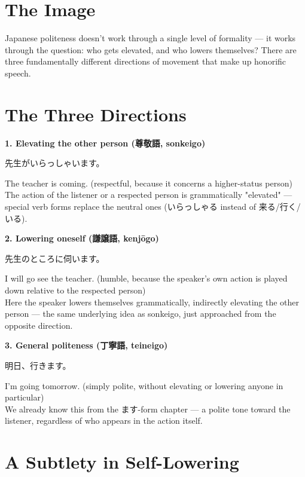 \documentclass[12pt]{book}
\begin{document}
\section*{The Image}

Japanese politeness doesn't work through a single level of formality — it works through the question: who gets elevated, and who lowers themselves? There are three fundamentally different directions of movement that make up honorific speech.

\section*{The Three Directions}

\textbf{1. Elevating the other person (尊敬語, sonkeigo)}
\par\quad 先生がいらっしゃいます。\\
\par\quad The teacher is coming. (respectful, because it concerns a higher-status person)\\

The action of the listener or a respected person is grammatically "elevated" — special verb forms replace the neutral ones (いらっしゃる instead of 来る/行く/いる).

\textbf{2. Lowering oneself (謙譲語, kenjōgo)}
\par\quad 先生のところに伺います。\\
\par\quad I will go see the teacher. (humble, because the speaker's own action is played down relative to the respected person)\\

Here the speaker lowers themselves grammatically, indirectly elevating the other person — the same underlying idea as sonkeigo, just approached from the opposite direction.

\textbf{3. General politeness (丁寧語, teineigo)}
\par\quad 明日、行きます。\\
\par\quad I'm going tomorrow. (simply polite, without elevating or lowering anyone in particular)\\

We already know this from the ます-form chapter — a polite tone toward the listener, regardless of who appears in the action itself.

\section*{A Subtlety in Self-Lowering}
\end{document}
